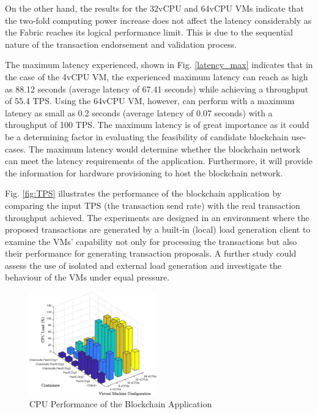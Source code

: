 \documentclass[conference]{IEEEtran}
\begin{document}
On the other hand, the results for the 32vCPU and 64vCPU VMs indicate that the two-fold computing power increase does not affect the latency considerably as the Fabric reaches its logical performance limit. This is due to the sequential nature of the transaction endorsement and validation process.

The maximum latency experienced, shown in Fig. \ref{latency_max} indicates that in the case of the 4vCPU VM, the experienced maximum latency can reach as high as 88.12 seconds (average latency of 67.41 seconds) while achieving a throughput of 55.4 TPS. Using the 64vCPU VM, however, can perform with a maximum latency as small as 0.2 seconds (average latency of 0.07 seconds) with a throughput of 100 TPS.
The maximum latency is of great importance as it could be a determining factor in evaluating the feasibility of candidate blockchain use-cases. The maximum latency would determine whether the blockchain network can meet the latency requirements of the application. Furthermore, it will provide the information for hardware provisioning to host the blockchain network. 


Fig. \ref{fig:TPS} illustrates the performance of the blockchain application by comparing the input TPS (the transaction send rate) with the real transaction throughput achieved. The experiments are designed in an environment where the proposed transactions are generated by a built-in (local) load generation client to examine the VMs' capability not only for processing the transactions but also their performance for generating transaction proposals. A further study could assess the use of isolated and external load generation and investigate the behaviour of the VMs under equal pressure.

\begin{figure}
    \centering
    \includegraphics[width=0.49\textwidth]{figs/cpu.eps}
    \caption{CPU Performance of the Blockchain Application}
    \label{fig:cpu}
\end{figure}
\end{document}

